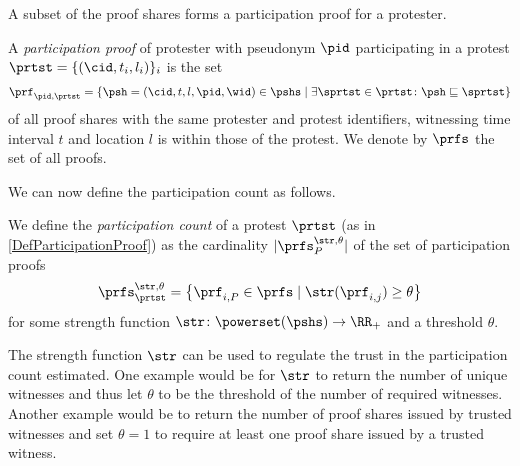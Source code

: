 A subset of the proof shares forms a participation proof for a protester.

\NewVariable{\prf}{\pi}
\NewVariable{\prfs}{\Pi}

\begin{definition}%
  \label{DefParticipationProof}
  A \emph{participation proof} of protester with pseudonym \(\pid\) participating in a protest \(\prtst = \{ (\cid, t_i, l_i) \}_i\) is the set
  \begin{multline}
    \nonumber
    \prf_{\pid, \prtst} =
    \left\{ \psh = (\cid, t, l, \pid, \wid)\in \pshs \mid
      \exists \sprtst\in \prtst\colon \psh\sqsubseteq \sprtst \right\}
  \end{multline}
  of all proof shares with the same protester and protest identifiers, witnessing time interval \(t\) and location \(l\) is within those of the protest.
We denote by \(\prfs\) the set of all proofs.
\end{definition}

\NewFunction{\str}{\varsigma}

We can now define the participation count as follows.

\begin{definition}
  We define the \emph{participation count} of a protest \(\prtst\) (as in 
  \cref{DefParticipationProof}) as the cardinality \(|\prfs_{P}^{\str,\theta}|\) 
  of the set of participation proofs \[
    \prfs_{\prtst}^{\str,\theta} = \left\{ \prf_{i,P} \in \prfs \mid
      \str(\prf_{i,j})\geq \theta \right\}
  \] for some strength function \(\str\colon \powerset(\pshs)\to \RR_+\) and a threshold \(\theta\).
\end{definition}

The strength function \(\str\) can be used to regulate the trust in the participation count estimated.
One example would be for \(\str\) to return the number of unique witnesses and thus let \(\theta\) to be the threshold of the number of required witnesses.
Another example would be to return the number of proof shares issued by trusted witnesses and set \(\theta = 1\) to require at least one proof share issued by a trusted witness.





